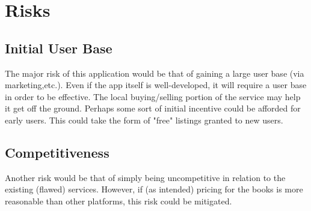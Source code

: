 \documentclass[12pt]{article}
\begin{document}
	\section{Risks}
	
		\subsection{Initial User Base}
		The major risk of this application would be that of gaining a large user base (via marketing,etc.).
        	Even if the app itself is well-developed, it will require a user base in order to be effective. The local
		buying/selling portion of the service may help it get off the ground.	
		Perhaps some sort of initial incentive could be afforded for early users. This could take the form of "free"
		listings granted to new users. 
		\subsection{Competitiveness}
		Another risk would be that of simply being uncompetitive in relation to the existing (flawed)
		services. However, if (as intended) pricing for the books is more reasonable than other platforms, this risk
		could be mitigated.	




\end{document}

